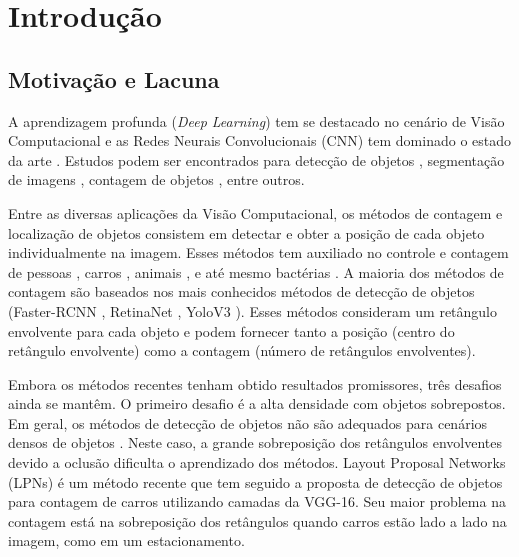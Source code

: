 
\chapter{Introdução}

 \section{Motivação e Lacuna}
 \label{sec:Motivacao}


A aprendizagem profunda (\textit{Deep Learning}) tem se destacado no cenário de Visão Computacional e as Redes Neurais Convolucionais (CNN) \cite{Simonyan14c} tem dominado o estado da arte \cite{ANN}. Estudos podem ser encontrados para detecção de objetos \cite{DBLP:journals/corr/abs-1904-00889, 8437104, 8489369, rs11010011, 8186148}, segmentação de imagens \cite{Zhao2017CVPR,DBLP:journals/corr/CaoSWS16}, contagem de objetos \cite{8186148,DBLP:journals/corr/CaoSWS16,articleLuiz}, entre outros.

Entre as diversas aplicações da Visão Computacional, os métodos de contagem e localização de objetos consistem em detectar e obter a posição de cada objeto individualmente na imagem.
Esses métodos tem auxiliado no controle e contagem de pessoas \cite{ExtractHuman}, carros \cite{CarCount}, animais \cite{8639306}, e até mesmo bactérias \cite{7320116}.
    A maioria dos métodos de contagem são baseados nos mais conhecidos métodos de detecção de objetos (Faster-RCNN \cite{DBLP:journals/corr/Girshick15}, RetinaNet \cite{DBLP:journals/corr/abs-1708-02002}, YoloV3 \cite{DBLP:journals/corr/abs-1804-02767}).
    Esses métodos consideram um retângulo envolvente para cada objeto e podem fornecer tanto a posição (centro do retângulo envolvente) como a contagem (número de retângulos envolventes).

    Embora os métodos recentes tenham obtido resultados promissores, três desafios ainda se mantêm.
    O primeiro desafio é a alta densidade com objetos sobrepostos.
    Em geral, os métodos de detecção de objetos não são adequados para cenários densos de objetos \cite{Goldman2019CVPR}.
    Neste caso, a grande sobreposição dos retângulos envolventes devido a oclusão dificulta o aprendizado dos métodos. Layout Proposal Networks (LPNs) \cite{8237708} é um método recente que tem seguido a proposta de detecção de objetos para contagem de carros utilizando camadas da VGG-16. Seu maior problema na contagem está na sobreposição dos retângulos quando carros estão lado a lado na imagem, como em um estacionamento.



